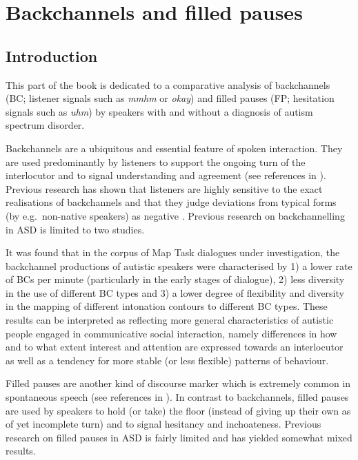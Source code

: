 \chapter{Backchannels and filled pauses} \label{backchannels}

\section{Introduction}\label{sec:BCFP_introduction}

This part of the book is dedicated to a comparative analysis of backchannels (BC; listener signals such as \emph{mmhm} or \emph{okay}) and filled pauses (FP; hesitation signals such as \emph{uhm}) by speakers with and without a diagnosis of autism spectrum disorder.

Backchannels are a ubiquitous and essential feature of spoken interaction. They are used predominantly by listeners to support the ongoing turn of the interlocutor and to signal understanding and agreement (see references in ). Previous research has shown that listeners are highly sensitive to the exact realisations of backchannels and that they judge deviations from typical forms (by e.g.~non-native speakers) as negative \citep[e.g.][]{liBackchannelResponsesMisleading2006}. Previous research on backchannelling in ASD is limited to two studies.

It was found that in the corpus of Map Task dialogues under investigation, the backchannel productions of autistic speakers were characterised by 1) a lower rate of BCs per minute (particularly in the early stages of dialogue), 2) less diversity in the use of different BC types and 3) a lower degree of flexibility and diversity in the mapping of different intonation contours to different BC types. These results can be interpreted as reflecting more general characteristics of autistic people engaged in communicative social interaction, namely differences in how and to what extent interest and attention are expressed towards an interlocutor as well as a tendency for more stable (or less flexible) patterns of behaviour.

Filled pauses are another kind of discourse marker which is extremely common in spontaneous speech (see references in ). In contrast to backchannels, filled pauses are used by speakers to hold (or take) the floor (instead of giving up their own as of yet incomplete turn) and to signal hesitancy and inchoateness. Previous research on filled pauses in ASD is fairly limited and has yielded somewhat mixed results.

